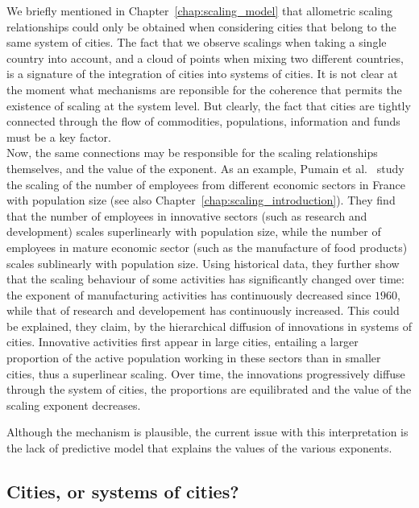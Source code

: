 We briefly mentioned in Chapter~\ref{chap:scaling_model} that allometric scaling relationships
could only be obtained when considering cities that belong to the same system of
cities. The fact that we observe scalings when taking a single country into
account, and a cloud of points when mixing two different countries, is a
signature of the integration of cities into systems of cities. It is
not clear at the moment what mechanisms are reponsible for the
coherence that permits the existence of scaling at the system level. But
clearly, the fact that cities are tightly connected through
the flow of commodities, populations, information and funds must be a key
factor.\\

Now, the same connections may be responsible for the scaling relationships
themselves, and the value of the exponent. As an example, Pumain et
al.~\cite{Pumain:2006} study the scaling of the number of employees from
different economic sectors in France with population size (see also
Chapter~\ref{chap:scaling_introduction}). They find that the number of employees
in innovative sectors (such as research and development) scales superlinearly
with population size, while the number of employees in mature economic sector
(such as the manufacture of food products) scales sublinearly with population
size. Using historical data, they further show that the scaling behaviour of
some activities has significantly changed over time: the exponent of
manufacturing activities has continuously decreased since $1960$, while that of
research and developement has continuously increased. This could be explained,
they claim, by the hierarchical diffusion of innovations in systems of cities.
Innovative activities first appear in large cities, entailing a larger
proportion of the active population working in these sectors than in smaller
cities, thus a superlinear scaling.  Over time, the innovations progressively
diffuse through the system of cities, the proportions are equilibrated and the
value of the scaling exponent decreases.

Although the mechanism is plausible, the current issue with this interpretation
is the lack of predictive model that explains the values of the various
exponents. 


\subsection{Cities, or systems of cities?}
\label{sub:cities_or_systems_of_cities_}

